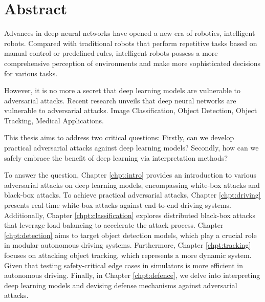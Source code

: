 \chapter*{Abstract}

Advances in deep neural networks have opened a new era of robotics, intelligent robots. Compared with traditional robots that perform repetitive tasks based on manual control or predefined rules, intelligent robots possess a more comprehensive perception of environments and make more sophisticated decisions for various tasks.
 
However, it is no more a secret that deep learning models are vulnerable to adversarial attacks. Recent research unveils that deep neural networks are vulnerable to adversarial attacks. Image Classification, Object Detection, Object Tracking, Medical Applications.

This thesis aims to address two critical questions: Firstly, can we develop practical adversarial attacks against deep learning models? Secondly, how can we safely embrace the benefit of deep learning via interpretation methods?

To answer the question, Chapter \ref{chpt:intro} provides an introduction to various adversarial attacks on deep learning models, encompassing white-box attacks and black-box attacks. To achieve practical adversarial attacks, Chapter \ref{chpt:driving} presents real-time white-box attacks against end-to-end driving systems. Additionally, Chapter \ref{chpt:classification} explores distributed black-box attacks that leverage load balancing to accelerate the attack process. Chapter \ref{chpt:detection} aims to target object detection models, which play a crucial role in modular autonomous driving systems. Furthermore, Chapter \ref{chpt:tracking} focuses on attacking object tracking, which represents a more dynamic system. Given that testing safety-critical edge cases in simulators is more efficient in autonomous driving. Finally, in Chapter \ref{chpt:defence}, we delve into interpreting deep learning models and devising defense mechanisms against adversarial attacks.

